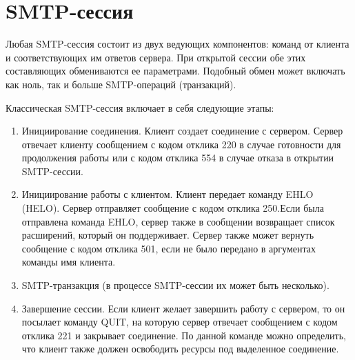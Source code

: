 \documentclass[a4paper,12pt]{report}
\begin{document}
	 \section{SMTP-сессия}
	
	Любая SMTP-сессия состоит из двух ведующих компонентов: команд от клиента и соответствующих им ответов сервера. 
	При открытой сессии обе этих составляющих обмениваются ее параметрами. 
	Подобный обмен может включать как ноль, так и больше SMTP-операций (транзакций).

	Классическая SMTP-сессия включает в себя следующие этапы:
	\begin{enumerate}
		\item Инициирование соединения. Клиент создает соединение с сервером. Сервер отвечает клиенту сообщением с кодом отклика 220 в случае готовности для продолжения работы или с кодом отклика 554 в случае отказа в открытии SMTP-сессии.
		\item Инициирование работы с клиентом. Клиент передает команду EHLO (HELO). Сервер отправляет сообщение с кодом отклика 250.Если была отправлена команда EHLO, сервер также в сообщении возвращает список расширений, который он поддерживает. Сервер также может вернуть сообщение с кодом отклика 501, если не было передано в аргументах команды имя клиента.
		\item SMTP-транзакция (в процессе SMTP-сессии их может быть несколько).
		\item Завершение сессии. Если клиент желает завершить работу с сервером, то он посылает команду QUIT, на которую сервер отвечает сообщением с кодом отклика 221 и закрывает соединение. По данной команде можно определить, что клиент также должен освободить ресурсы под выделенное соединение.
	\end{enumerate}
\end{document}
